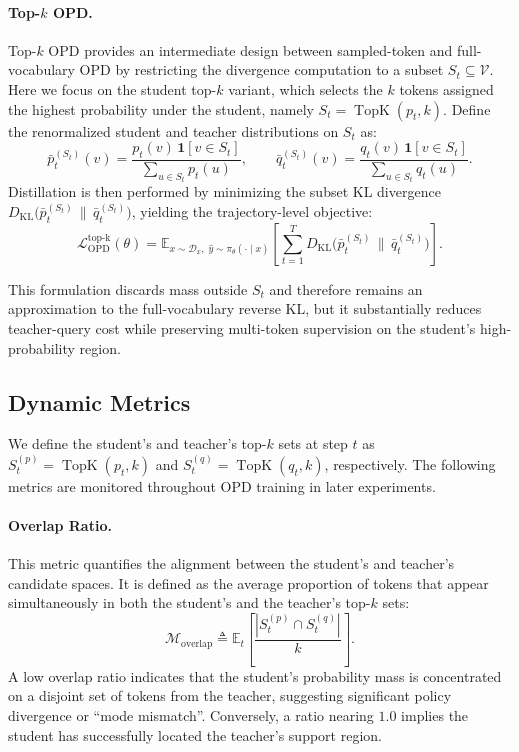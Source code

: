 \paragraph{Top-$k$ OPD.}
Top-$k$ OPD provides an intermediate design between sampled-token and
full-vocabulary OPD by restricting the divergence computation to a subset
$S_t \subseteq \mathcal{V}$. Here we focus on the student top-$k$ variant,
which selects the $k$ tokens assigned the highest probability under the
student, namely $S_t = \operatorname{TopK}(p_t, k)$.
Define the renormalized student and teacher distributions on $S_t$ as:
\[
\bar{p}_t^{(S_t)}(v)
=
\frac{p_t(v)\,\mathbf{1}[v \in S_t]}
     {\sum_{u \in S_t} p_t(u)},
\qquad
\bar{q}_t^{(S_t)}(v)
=
\frac{q_t(v)\,\mathbf{1}[v \in S_t]}
     {\sum_{u \in S_t} q_t(u)}.
\]
Distillation is then performed by minimizing the subset KL divergence $ D_{\mathrm{KL}}\!\bigl(\bar{p}_t^{(S_t)} \,\|\, \bar{q}_t^{(S_t)}\bigr)$, yielding the trajectory-level objective:
\begin{equation}
  \mathcal{L}_{\mathrm{OPD}}^{\mathrm{top\text{-}k}}(\theta)
  =
  \mathbb{E}_{x \sim \mathcal{D}_x,\;
      \hat{y} \sim \pi_\theta(\cdot \mid x)}
  \left[
    \sum_{t=1}^{T}
    D_{\mathrm{KL}}\!\bigl(\bar{p}_t^{(S_t)} \,\|\, \bar{q}_t^{(S_t)}\bigr)
  \right].
  \label{eq:opd_topk_obj_prelim}
\end{equation}

This formulation discards mass outside $S_t$ and therefore remains an approximation to the full-vocabulary reverse KL, but it substantially reduces teacher-query cost while preserving multi-token supervision on the student's high-probability region.

\subsection{Dynamic Metrics}
\label{sec:dynamic_metrics}

We define the student's and teacher's top-$k$ sets at step $t$
as $S_t^{(p)} = \operatorname{TopK}(p_t, k)$ and
$S_t^{(q)} = \operatorname{TopK}(q_t, k)$, respectively.
The following metrics are monitored throughout OPD training in later experiments.


\paragraph{Overlap Ratio.}
This metric quantifies the alignment between the student's and teacher's candidate spaces. It is defined as the average proportion of tokens that appear simultaneously in both the student's and the teacher's top-$k$ sets:
\begin{equation}
\mathcal{M}_{\text{overlap}}
\triangleq
\mathbb{E}_{t} \left[ \frac{|S_t^{(p)} \cap S_t^{(q)}|}{k} \right].
\label{eq:metric_overlap}
\end{equation}
A low overlap ratio indicates that the student's probability mass is concentrated on a disjoint set of tokens from the teacher, suggesting significant policy divergence or ``mode mismatch''. Conversely, a ratio nearing $1.0$ implies the student has successfully located the teacher's support region.

